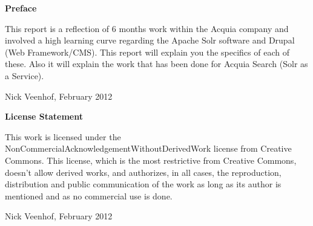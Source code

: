 
\newpage

\noindent \textbf{\huge Preface}

\vspace{1.5cm}

\noindent
This report is a reflection of 6 months work within the Acquia company and involved a high learning curve regarding the Apache Solr software and Drupal (Web Framework/CMS). This report will explain you the specifics of each of these. Also it will explain the work that has been done for Acquia Search (Solr as a Service).

\addvspace{4cm}

\noindent Nick Veenhof, February 2012\newpage

\noindent \textbf{\huge License Statement}

\vspace{1.5cm}

\noindent
This work is licensed under the NonCommercialAcknowledgementWithoutDerivedWork license from Creative Commons. 
This license, which is the most restrictive from Creative Commons, doesn't allow derived works, and authorizes, in all cases, the reproduction, distribution and public communication of the work as long as its author is mentioned and as no commercial use is done.

\addvspace{4cm}

\noindent Nick Veenhof, February 2012

